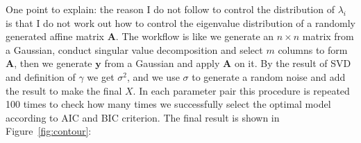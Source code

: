 \documentclass[12pt,a4paper,UTF8,fntef]{article}
\begin{document}
One point to explain: the reason I do not follow to control the distribution of $\lambda_i$ is that I do  not work  out how to control the eigenvalue distribution of a randomly generated affine matrix $\mathbf{A}$. The workflow is like we generate an $n\times n$ matrix from a Gaussian, conduct singular value decomposition and select $m$ columns to form $\mathbf{A}$, then we generate $\mathbf{y}$ from a Gaussian and apply $\mathbf{A}$ on it. By the result of SVD and definition of $\gamma$ we get $\sigma^2$, and we use $\sigma$ to generate a random noise and add the result to make the final $X$. In each parameter pair this procedure is repeated 100 times to check how many times we successfully select the optimal model according to AIC and BIC criterion. The final result is shown in Figure~\ref{fig:contour}:

\begin{figure}[htbp]
	\centering
	

\end{figure}
\end{document}
